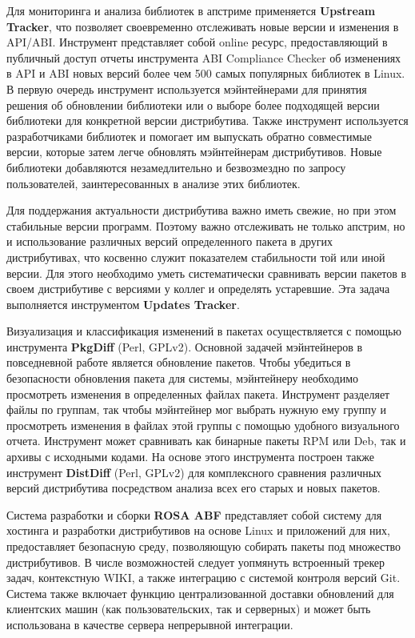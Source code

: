 \documentclass[10pt, a5paper]{article}
\begin{document}
Для мониторинга и анализа библиотек в апстриме применяется \textbf{Upstream Tracker}, что позволяет своевременно отслеживать новые версии и изменения в API/ABI. Инструмент представляет собой online ресурс, предоставляющий в публичный доступ отчеты инструмента ABI Compliance Checker об изменениях в API и ABI новых версий более чем 500 самых популярных библиотек в Linux. В первую очередь инструмент используется мэйнтейнерами для принятия решения об обновлении библиотеки или о выборе более подходящей версии библиотеки для конкретной версии дистрибутива. Также инструмент используется разработчиками библиотек и помогает им выпускать обратно совместимые версии, которые затем легче обновлять мэйнтейнерам дистрибутивов. Новые библиотеки добавляются незамедлительно и безвозмездно по запросу пользователей, заинтересованных в анализе этих библиотек.

Для поддержания актуальности дистрибутива важно иметь свежие, но при этом стабильные версии программ. Поэтому важно отслеживать не только апстрим, но и использование различных версий определенного пакета в других дистрибутивах, что косвенно служит показателем стабильности той или иной версии. Для этого необходимо уметь систематически сравнивать версии пакетов в своем дистрибутиве с версиями у коллег и определять устаревшие. Эта задача выполняется инструментом \textbf{Updates Tracker}.

Визуализация и классификация изменений в пакетах осуществляется с помощью инструмента \textbf{PkgDiff} (Perl, GPLv2). Основной задачей мэйнтейнеров в повседневной работе является обновление пакетов. Чтобы убедиться в безопасности обновления пакета для системы, мэйнтейнеру необходимо просмотреть изменения в определенных файлах пакета. Инструмент разделяет файлы по группам, так чтобы мэйнтейнер мог выбрать нужную ему группу и просмотреть изменения в файлах этой группы с помощью удобного визуального отчета. Инструмент может сравнивать как бинарные пакеты RPM или Deb, так и архивы с исходными кодами. На основе этого инструмента построен также инструмент \textbf{DistDiff} (Perl, GPLv2) для комплексного сравнения различных версий дистрибутива посредством анализа всех его старых и новых пакетов.

Система разработки и сборки \textbf{ROSA ABF} представляет собой систему для хостинга и разработки дистрибутивов на основе Linux и приложений для них, предоставляет безопасную среду, позволяющую собирать пакеты под множество дистрибутивов. В числе возможностей следует уопмянуть встроенный трекер задач, контекстную WIKI, а также интеграцию с системой контроля версий Git. Система также включает функцию централизованной доставки обновлений для клиентских машин (как пользовательских, так и серверных) и может быть использована в качестве сервера непрерывной интеграции.
\end{document}
